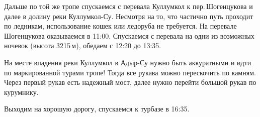     Дальше по той же тропе спускаемся с перевала Куллумкол к пер.\,Шогенцукова и далее в долину реки Куллумкол-Су.
    Несмотря на то, что частично путь проходит по ледникам, использование кошек или ледоруба не требуется. На
    перевале Шогенцукова оказываемся в 11:00. Спускаемся с перевала на одни из возможных ночевок (высота 3215\,м),
    обедаем с 12:20 до 13:35.

    На месте впадения реки Куллумкол в Адыр-Су нужно быть аккуратными и идти по маркированной турами тропе!
    Тогда все рукава можно перескочить по камням. Через первый рукав есть надежный мост, далее нужно перейти
    большой рукав по курумнику.

    Выходим на хорошую дорогу, спускаемся к турбазе в 16:35.

    \FloatBarrier
    
    
    
    
    
